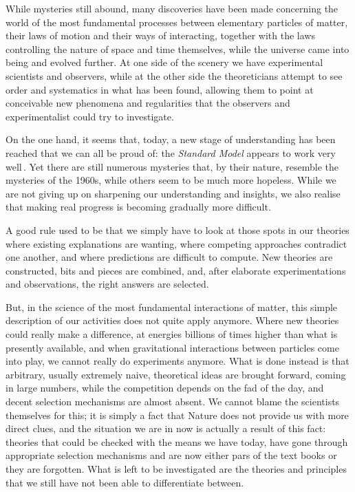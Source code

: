 \documentclass[12pt]{article}
\begin{document}
While mysteries still abound,  many discoveries have been made concerning
the world of the most fundamental processes between elementary particles of matter, their laws of motion and their ways of interacting, together with the laws controlling the nature of space and time themselves, while the universe came into being and evolved further. At one side of the scenery we have experimental scientists and observers, while at the other side the theoreticians attempt to see order and systematics in what has been found, allowing them to point at conceivable new phenomena and regularities that the observers and experimentalist could try to investigate.
  
On the one hand, it seems that, today, a new stage of understanding has been reached that we can all be proud of: the \emph{Standard Model} appears to work very well\,\cite{SM}. Yet there are still numerous mysteries that, by their nature, resemble the mysteries of the 1960s, while others seem to be much more hopeless. While we are not giving up on sharpening our understanding and insights, we also realise that making real progress is becoming gradually more difficult. 

A good rule used to be that we simply have to look at those spots in our theories where existing explanations are wanting, where competing approaches contradict one another, and where predictions are difficult to compute. New theories are constructed, bits and pieces are combined, and, after elaborate experimentations and observations, the right answers are selected.

But, in the science of the most fundamental interactions of matter, this simple description of our activities does not quite apply anymore. Where new theories could really make a difference, at energies billions of times higher than what is presently available, and when gravitational interactions between particles come into play, we cannot really do experiments anymore. What is done instead is that arbitrary, usually extremely naive, theoretical ideas are brought forward, coming in large numbers, while the competition depends on the fad of the day, and decent selection mechanisms are almost absent. We cannot blame the scientists themselves for this; it is simply a fact that Nature does not provide us with more direct clues, and the situation we are in now is actually a result of this fact: theories that could be checked with the means we have today, have gone through appropriate selection mechanisms and are now either pars of the text books or they are forgotten. What is left to be investigated are the theories and principles that we still have not been able to differentiate between.
\end{document}
